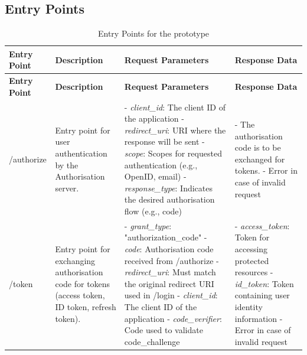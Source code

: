 \subsection{Entry Points}
\begin{longtable}{|p{3cm}|p{4cm}|p{4cm}|p{4cm}|}
\caption{Entry Points for the prototype}
\label{table:threat_model_entry_points}
\hline
\rowcolor{grey!15}
\textbf{Entry Point} & \textbf{Description} & \textbf{Request Parameters} & \textbf{Response Data} \\
\hline
\endfirsthead
\hline
\rowcolor{grey!15}
\textbf{Entry Point} & \textbf{Description} & \textbf{Request Parameters} & \textbf{Response Data} \\
\hline
\endhead
\endfoot
\hline
\endlastfoot

/authorize & Entry point for user authentication by the Authorisation server.  & 
- \textit{client\_id}: The client ID of the application \newline 
- \textit{redirect\_uri}: URI where the response will be sent \newline
- \textit{scope}: Scopes for requested authentication (e.g., OpenID, email) \newline 
- \textit{response\_type}: Indicates the desired authorisation flow (e.g., code) \citep{openid_docs} & 
- The authorisation code is to be exchanged for tokens. \newline 
- Error in case of invalid request \\
\hline

/token & Entry point for exchanging authorisation code for tokens (access token, ID token, refresh token). & 
- \textit{grant\_type}: "authorization\_code" \newline 
- \textit{code}: Authorisation code received from /authorize \newline
- \textit{redirect\_uri}: Must match the original redirect URI used in /login \newline 
- \textit{client\_id}: The client ID of the application
- \textit{code\_verifier}: Code used to validate code\_challenge \citep{openid_docs}& 
- \textit{access\_token}: Token for accessing protected resources \newline 
- \textit{id\_token}: Token containing user identity information \newline 
- Error in case of invalid request \\
\hline

\end{longtable}

